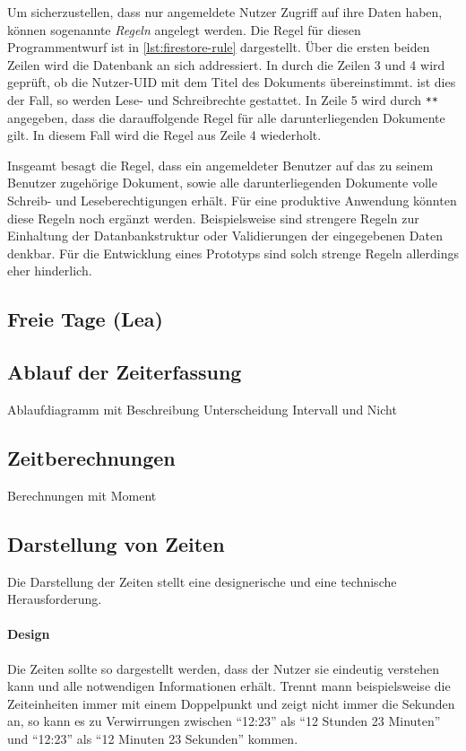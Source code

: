Um sicherzustellen, dass nur angemeldete Nutzer Zugriff auf ihre Daten haben,
können sogenannte \textit{Regeln} angelegt werden.
Die Regel für diesen Programmentwurf ist in \autoref{lst:firestore-rule} dargestellt.
Über die ersten beiden Zeilen wird die Datenbank an sich addressiert.
In durch die Zeilen 3 und 4 wird geprüft, ob die Nutzer-UID mit dem Titel des Dokuments übereinstimmt.
ist dies der Fall, so werden Lese- und Schreibrechte gestattet.
In Zeile 5 wird durch \lstinline[language=firestoreRule]{**} angegeben,
dass die darauffolgende Regel für alle darunterliegenden Dokumente gilt.
In diesem Fall wird die Regel aus Zeile 4 wiederholt.




Insgeamt besagt die Regel,
dass ein angemeldeter Benutzer auf das zu seinem Benutzer zugehörige Dokument,
sowie alle darunterliegenden Dokumente volle Schreib- und Leseberechtigungen erhält.
Für eine produktive Anwendung könnten diese Regeln noch ergänzt werden.
Beispielsweise sind strengere Regeln zur Einhaltung der Datanbankstruktur oder Validierungen der eingegebenen Daten denkbar.
Für die Entwicklung eines Prototyps sind solch strenge Regeln allerdings eher hinderlich.

\subsection{Freie Tage (Lea)}

\subsection{Ablauf der Zeiterfassung}
Ablaufdiagramm mit Beschreibung
Unterscheidung Intervall und Nicht

\subsection{Zeitberechnungen}
Berechnungen mit Moment

\subsection{Darstellung von Zeiten}
Die Darstellung der Zeiten stellt eine designerische und eine technische Herausforderung.

\paragraph{Design}
Die Zeiten sollte so dargestellt werden,
dass der Nutzer sie eindeutig verstehen kann und alle notwendigen Informationen erhält.
Trennt mann beispielsweise die Zeiteinheiten immer mit einem Doppelpunkt und zeigt nicht immer die Sekunden an,
so kann es zu Verwirrungen zwischen \enquote{12:23} als \enquote{12 Stunden 23 Minuten}
und \enquote{12:23} als \enquote{12 Minuten 23 Sekunden} kommen.

